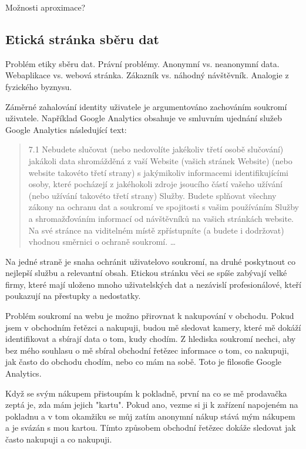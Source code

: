 \documentclass[bc,female,java,dept456]{diploma}						%
\begin{document}
Možnosti aproximace?



\subsection{Etická stránka sběru dat}

Problém etiky sběru dat.
Právní problémy.
Anonymní vs. neanonymní data.
Webaplikace vs. webová stránka.
Zákazník vs. náhodný návštěvník.
Analogie z fyzického byznysu.


Záměrné zahalování identity uživatele je argumentováno zachováním soukromí uživatele. Například Google Analytics obsahuje ve smluvním ujednání služeb Google Analytics následující text:

\begin{quote}
7.1 Nebudete slučovat (nebo nedovolíte jakékoliv třetí osobě slučování) jakákoli data shromážděná z vaší Website (vašich stránek Website) (nebo website takovéto třetí strany) s jakýmikoliv informacemi identifikujícími osoby, které pocházejí z jakéhokoli zdroje jsoucího částí vašeho užívání (nebo užívání takovéto třetí strany) Služby. Budete splňovat všechny zákony na ochranu dat a soukromí ve spojitosti s vašim používáním Služby a shromažďováním informací od návštěvníků na vašich stránkách website. Na své stránce na viditelném místě zpřístupníte (a budete i dodržovat) vhodnou směrnici o ochraně soukromí.
\ldots
\end{quote}

Na jedné straně je snaha ochránit uživatelovo soukromí, na druhé poskytnout co nejlepší službu a relevantní obsah. Etickou stránku věci se spíše zabývají velké firmy, které mají uloženo mnoho uživatelských dat a nezávislí profesionálové, kteří poukazují na přestupky a nedostatky.

Problém soukromí na webu je možno přirovnat k nakupování v obchodu. Pokud jsem v obchodním řetězci a nakupuji, budou mě sledovat kamery, které mě dokáží identifikovat a sbírají data o tom, kudy chodím. Z hlediska soukromí nechci, aby bez mého souhlasu o mě sbíral obchodní řetězec informace o tom, co nakupuji, jak často do obchodu chodím, nebo co mám na sobě. Toto je filosofie Google Analytics.

Když se svým nákupem přistoupím k pokladně, první na co se mě prodavačka zeptá je, zda mám jejich "kartu". Pokud ano, vezme si ji k zařízení napojeném na pokladnu a v tom okamžiku se můj zatím anonymní nákup stává mým nákupem a je svázán s mou kartou. Tímto způsobem obchodní řetězec dokáže sledovat jak často nakupuji a co nakupuji.
\end{document}
